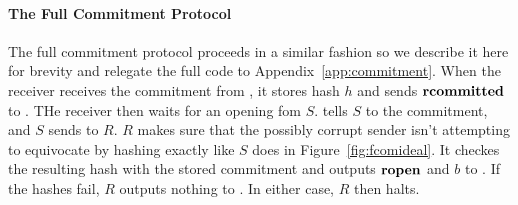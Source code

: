 \paragraph{The Full Commitment Protocol}
The full commitment protocol proceeds in a similar fashion so we describe it here for brevity and relegate the full code to Appendix~\ref{app:commitment}.
When the receiver receives the commitment from \Fro, it stores hash $h$ and sends $\mathbf{rcommitted}$ to \Z.
THe receiver then waits for an opening fom $S$.
\Z tells $S$ to  the commitment, and $S$ sends  to $R$. 
$R$ makes sure that the possibly corrupt sender isn't attempting to equivocate by hashing  exactly like $S$ does in Figure~\ref{fig:fcomideal}.
It checkes the resulting hash with the stored commitment and outputs $\mathbf{ropen}$ and $b$ to \Z.
If the hashes fail, $R$ outputs nothing to \Z. In either case, $R$ then halts.






